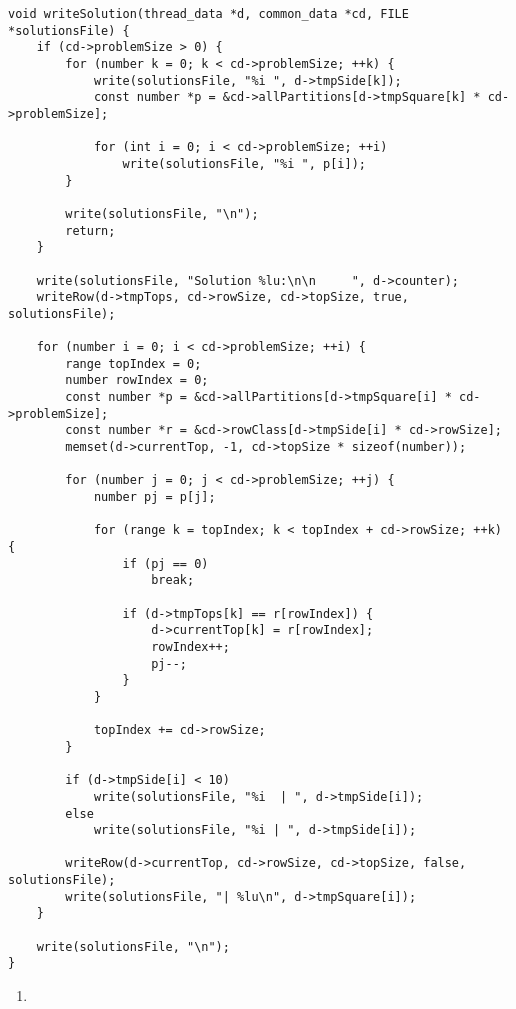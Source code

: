 \begin{lstlisting}[caption={},label={writeSolution}]
void writeSolution(thread_data *d, common_data *cd, FILE *solutionsFile) {
    if (cd->problemSize > 0) {
        for (number k = 0; k < cd->problemSize; ++k) {
            write(solutionsFile, "%i ", d->tmpSide[k]);
            const number *p = &cd->allPartitions[d->tmpSquare[k] * cd->problemSize];

            for (int i = 0; i < cd->problemSize; ++i)
                write(solutionsFile, "%i ", p[i]);
        }

        write(solutionsFile, "\n");
        return;
    }

    write(solutionsFile, "Solution %lu:\n\n     ", d->counter);
    writeRow(d->tmpTops, cd->rowSize, cd->topSize, true, solutionsFile);

    for (number i = 0; i < cd->problemSize; ++i) {
        range topIndex = 0;
        number rowIndex = 0;
        const number *p = &cd->allPartitions[d->tmpSquare[i] * cd->problemSize];
        const number *r = &cd->rowClass[d->tmpSide[i] * cd->rowSize];
        memset(d->currentTop, -1, cd->topSize * sizeof(number));

        for (number j = 0; j < cd->problemSize; ++j) {
            number pj = p[j];

            for (range k = topIndex; k < topIndex + cd->rowSize; ++k) {
                if (pj == 0)
                    break;

                if (d->tmpTops[k] == r[rowIndex]) {
                    d->currentTop[k] = r[rowIndex];
                    rowIndex++;
                    pj--;
                }
            }

            topIndex += cd->rowSize;
        }

        if (d->tmpSide[i] < 10)
            write(solutionsFile, "%i  | ", d->tmpSide[i]);
        else
            write(solutionsFile, "%i | ", d->tmpSide[i]);

        writeRow(d->currentTop, cd->rowSize, cd->topSize, false, solutionsFile);
        write(solutionsFile, "| %lu\n", d->tmpSquare[i]);
    }

    write(solutionsFile, "\n");
}
\end{lstlisting}

\begin{enumerate}
\addtocounter{enumi}{1}
\item 
\end{enumerate}

